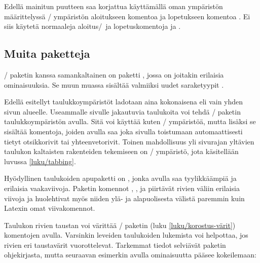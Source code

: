 Edellä mainitun puutteen saa korjattua käyttämällä oman ympäristön
määrittelyssä \-/ ympäristön aloitukseen komentoa
 ja lopetukseen komentoa . Ei
siis käytetä normaaleja aloitus\-/\ ja lopetuskomentoja 
ja .

\begin{koodilohkosis}
\newenvironment{omataulukko}[1]
{\tabularx{\linewidth}{#1}}
{\endtabularx}
\end{koodilohkosis}

\subsection{Muita paketteja}

\-/ paketin kanssa samankaltainen on paketti
, jossa on joitakin erilaisia
ominaisuuksia. Se muun muassa sisältää valmiiksi uudet saraketyypit
.

Edellä esitellyt taulukkoympäristöt ladotaan aina kokonaisena eli vain
yhden sivun alueelle. Useammalle sivulle jakautuvia taulukoita voi tehdä
\-/ paketin taulukkoympäristön
 avulla. Sitä voi käyttää kuten
\-/ ympäristöä, mutta lisäksi se sisältää komentoja,
joiden avulla saa joka sivulla toistumaan automaattisesti tietyt
otsikkorivit tai yhteenvetorivit. Toinen mahdollisuus yli sivurajan
yltävien taulukon kaltaisten rakenteiden tekemiseen on
\-/ ympäristö, jota käsitellään luvussa
\ref{luku/tabbing}.

Hyödyllinen taulukoiden apupaketti on
, jonka avulla saa tyylikkäämpiä ja
erilaisia vaakaviivoja. Paketin komennot ,
,  ja  piirtävät
rivien väliin erilaisia viivoja ja huolehtivat myös niiden ylä- ja
alapuolisesta välistä paremmin kuin Latexin omat viivakomennot.

Taulukon rivien taustan voi värittää \-/
paketin (luku \ref{luku/korostus-värit}) komentojen
avulla. Varsinkin leveiden taulukoiden lukemista voi helpottaa, jos
rivien eri taustavärit vuorottelevat. Tarkemmat tiedot selviävät paketin
ohjekirjasta, mutta seuraavan esimerkin avulla ominaisuutta pääsee
kokeilemaan:

\begin{koodilohkosis}
\usepackage[table]{xcolor}     %
\end{koodilohkosis}

